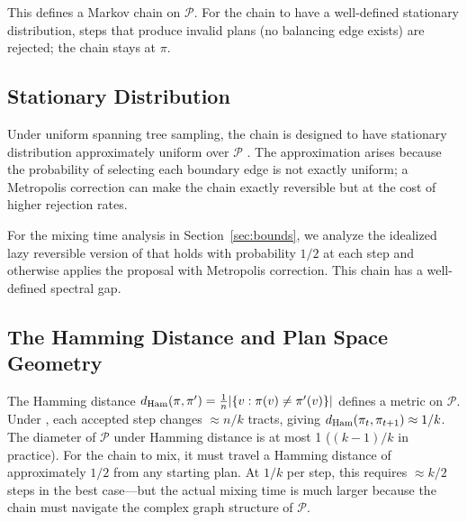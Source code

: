 This defines a Markov chain on $\mathcal{P}$.
For the chain to have a well-defined stationary distribution, steps that
produce invalid plans (no balancing edge exists) are rejected; the
chain stays at $\pi$.

\subsection{Stationary Distribution}

Under uniform spanning tree sampling, the \recom{} chain is designed
to have stationary distribution approximately uniform over $\mathcal{P}$
\citep{deford2021}.
The approximation arises because the probability of selecting each
boundary edge is not exactly uniform; a Metropolis correction can make
the chain exactly reversible but at the cost of higher rejection rates.

For the mixing time analysis in Section~\ref{sec:bounds}, we analyze the
idealized lazy reversible version of \recom{} that holds with probability
$1/2$ at each step and otherwise applies the \recom{} proposal with
Metropolis correction.
This chain has a well-defined spectral gap.

\subsection{The Hamming Distance and Plan Space Geometry}

The Hamming distance $d_{\rm Ham}(\pi, \pi') = \frac{1}{n}|\{v : \pi(v) \neq \pi'(v)\}|$
defines a metric on $\mathcal{P}$.
Under \recom{}, each accepted step changes $\approx n/k$ tracts, giving
$d_{\rm Ham}(\pi_t, \pi_{t+1}) \approx 1/k$.
The diameter of $\mathcal{P}$ under Hamming distance is at most 1
($(k-1)/k$ in practice).
For the chain to mix, it must travel a Hamming distance of approximately
$1/2$ from any starting plan.
At $1/k$ per step, this requires $\approx k/2$ steps in the best case---but
the actual mixing time is much larger because the chain must navigate the
complex graph structure of $\mathcal{P}$.
